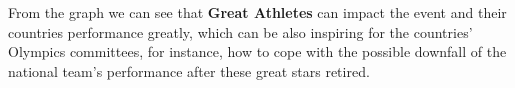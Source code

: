
From the graph we can see that \textbf{Great Athletes} can impact the event and their countries performance greatly, which can be also inspiring for the countries' Olympics committees,
for instance, how to cope with the possible downfall of the national team's performance after these great stars retired.
